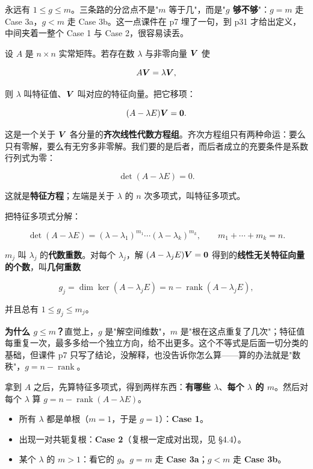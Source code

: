 \documentclass[11pt]{ctexart}
\newcommand{\rank}{\operatorname{rank}}
\begin{document}
永远有 $1\le g\le m$。三条路的分岔点不是"$m$ 等于几"，而是"\textbf{$g$ 够不够}"：$g=m$ 走 Case 3a，$g<m$ 走 Case 3b。这一点课件在 p7 埋了一句，到 p31 才给出定义，中间夹着一整个 Case 1 与 Case 2，很容易读丢。



设 $A$ 是 $n\times n$ 实常矩阵。若存在数 $\lambda$ 与非零向量 $\boldsymbol{V}$ 使

\[
A\boldsymbol{V}=\lambda\boldsymbol{V},
\]

则 $\lambda$ 叫特征值、$\boldsymbol{V}$ 叫对应的特征向量。把它移项：

\[
(A-\lambda E)\boldsymbol{V}=\boldsymbol{0}.
\]

这是一个关于 $\boldsymbol{V}$ 各分量的\textbf{齐次线性代数方程组}。齐次方程组只有两种命运：要么只有零解，要么有无穷多非零解。我们要的是后者，而后者成立的充要条件是系数行列式为零：

\[
\det(A-\lambda E)=0 .
\]

这就是\textbf{特征方程}；左端是关于 $\lambda$ 的 $n$ 次多项式，叫特征多项式。


把特征多项式分解：

\[
\det(A-\lambda E)=(\lambda-\lambda_1)^{m_1}\cdots(\lambda-\lambda_k)^{m_k},
\qquad m_1+\cdots+m_k=n .
\]

$m_j$ 叫 $\lambda_j$ 的\textbf{代数重数}。对每个 $\lambda_j$，解 $(A-\lambda_jE)\boldsymbol{V}=\boldsymbol{0}$ 得到的\textbf{线性无关特征向量的个数}，叫\textbf{几何重数}

\[
g_j=\dim\ker(A-\lambda_jE)=n-\rank(A-\lambda_jE),
\]

并且总有 $1\le g_j\le m_j$。

\textbf{为什么 $g\le m$？}直觉上，$g$ 是"解空间维数"，$m$ 是"根在这点重复了几次"；特征值每重复一次，最多多给一个独立方向，给不出更多。这个不等式是后面一切分类的基础，但课件 p7 只写了结论，没解释，也没告诉你怎么算——算的办法就是"数秩"，$g=n-\rank$。


拿到 $A$ 之后，先算特征多项式，得到两样东西：\textbf{有哪些 $\lambda$}、\textbf{每个 $\lambda$ 的 $m$}。然后对每个 $\lambda$ 算 $g=n-\rank(A-\lambda E)$。

\begin{itemize}
  \item 所有 $\lambda$ 都是单根（$m=1$，于是 $g=1$）：\textbf{Case 1}。
  \item 出现一对共轭复根：\textbf{Case 2}（复根一定成对出现，见 §4.4）。
  \item 某个 $\lambda$ 的 $m>1$：看它的 $g$。$g=m$ 走 \textbf{Case 3a}；$g<m$ 走 \textbf{Case 3b}。
\end{itemize}
\end{document}
